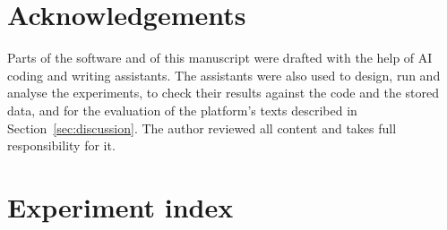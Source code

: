 \documentclass[11pt,a4paper]{article}
\begin{document}
\section*{Acknowledgements}

Parts of the software and of this manuscript were drafted with the help of
AI coding and writing assistants. The assistants were also used to design,
run and analyse the experiments, to check their results against the code
and the stored data, and for the evaluation of the platform's texts
described in Section~\ref{sec:discussion}. The author reviewed all content
and takes full responsibility for it.




\appendix
\section{Experiment index}
\label{app:experiments}
\end{document}
